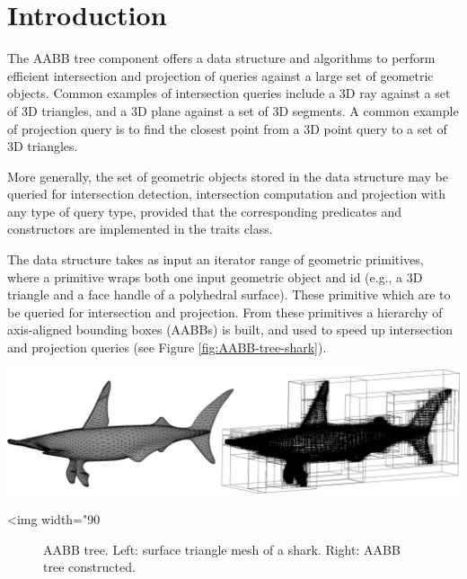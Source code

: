 \section{Introduction}
\label{AABB_tree_section_intro}

The AABB tree component offers a data structure and algorithms to perform efficient intersection and projection of queries against a large set of geometric objects. Common examples of intersection queries include a 3D ray against a set of 3D triangles, and a 3D plane against a set of 3D segments. A common example of projection query is to find the closest point from a 3D point query to a set of 3D triangles.

More generally, the set of geometric objects stored in the data structure may be queried for intersection detection, intersection computation and projection with any type of query type, provided that the corresponding predicates and constructors are implemented in the traits class. 

The data structure takes as input an iterator range of geometric primitives, where a primitive wraps both one input geometric object and id (e.g., a 3D triangle and a face handle of a polyhedral surface). These primitive which are to be queried for intersection and projection. From these primitives a hierarchy of axis-aligned bounding boxes (AABBs) is built, and used to speed up intersection and projection queries (see Figure \ref{fig:AABB-tree-shark}). 

\begin{center}
    \label{fig:AABB-tree-shark}
    \begin{ccTexOnly}
      \includegraphics[width=1.0\textwidth]{AABB_tree/shark}
    \end{ccTexOnly}
    \begin{ccHtmlOnly}
        <img width="90%
    \end{ccHtmlOnly}
    \begin{figure}[h]
        \caption{AABB tree.
                 Left: surface triangle mesh of a shark.
                 Right: AABB tree constructed.}
    \end{figure}
\end{center}

